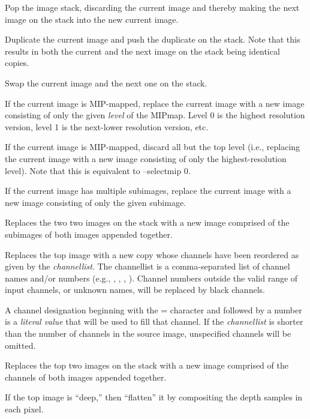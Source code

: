 Pop the image stack, discarding the current image and thereby
making the next image on the stack into the new current image.
\apiend

Duplicate the current image and push the duplicate on the stack.
Note that this results in both the current and the next image 
on the stack being identical copies.
\apiend

Swap the current image and the next one on the stack.
\apiend

If the current image is MIP-mapped, replace the current image with a new
image consisting of only the given \emph{level} of the MIPmap.
Level 0 is the highest resolution version, level 1 is the next-lower
resolution version, etc.
\apiend

If the current image is MIP-mapped, discard all but the top level
(i.e., replacing the current image with a new image consisting of only the
highest-resolution level).  Note that this is equivalent to 
{\cf --selectmip 0}.
\apiend

If the current image has multiple subimages, replace the current image
with a new image consisting of only the given subimage.
\apiend

\NEW   %
Replaces the two two images on the stack with a new image comprised of the
subimages of both images appended together.
\apiend

Replaces the top image with a new copy whose channels have been 
reordered as given by the \emph{channellist}.  The {\cf channellist}
is a comma-separated list of channel names and/or numbers (e.g., 
, , , ).  Channel numbers outside
the valid range of input channels, or unknown names, will be replaced
by black channels.

\NEW %
A channel designation beginning with the {\cf =} character and followed
by a number is a \emph{literal value} that will be used to fill that
channel.  If the \emph{channellist} is shorter than the number of
channels in the source image, unspecified channels will be omitted.
\apiend

Replaces the top two images on the stack with a new image comprised of
the channels of both images appended together.
\apiend

\NEW   %
If the top image is ``deep,'' then ``flatten'' it by compositing the depth
samples in each pixel.
\apiend


